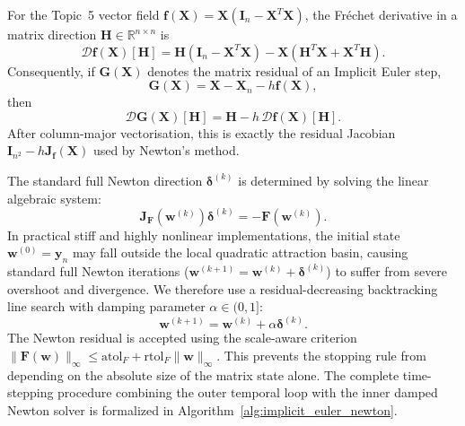 \documentclass[11pt,a4paper]{article}
\theoremstyle{definition}
\theoremstyle{remark}
\begin{document}
For the Topic~5 vector field
$\mathbf{f}(\mathbf{X})=\mathbf{X}(\mathbf{I}_n-\mathbf{X}^T\mathbf{X})$,
the Fr\'echet derivative in a matrix direction
$\mathbf{H}\in\mathbb{R}^{n\times n}$ is
\begin{equation}
\label{eq:topic5_frechet_derivative}
\mathcal{D}\mathbf{f}(\mathbf{X})[\mathbf{H}]
=\mathbf{H}(\mathbf{I}_n-\mathbf{X}^T\mathbf{X})
-\mathbf{X}(\mathbf{H}^T\mathbf{X}+\mathbf{X}^T\mathbf{H}).
\end{equation}
Consequently, if $\mathbf{G}(\mathbf{X})$ denotes the matrix residual of
an Implicit Euler step,
\begin{equation}
\label{eq:topic5_matrix_residual}
\mathbf{G}(\mathbf{X})=\mathbf{X}-\mathbf{X}_n-h\mathbf{f}(\mathbf{X}),
\end{equation}
then
\begin{equation}
\label{eq:topic5_residual_frechet}
\mathcal{D}\mathbf{G}(\mathbf{X})[\mathbf{H}]
=\mathbf{H}-h\,\mathcal{D}\mathbf{f}(\mathbf{X})[\mathbf{H}].
\end{equation}
After column-major vectorisation, this is exactly the residual Jacobian
$\mathbf{I}_{n^2}-h\mathbf{J}_{\mathbf f}(\mathbf X)$ used by Newton's method.

The standard full Newton direction $\boldsymbol{\delta}^{(k)}$ is determined by solving the linear algebraic system:
\begin{equation}
\label{eq:newton_linear_system}
\mathbf{J}_{\mathbf{F}}\left(\mathbf{w}^{(k)}\right) \boldsymbol{\delta}^{(k)} = -\mathbf{F}\left(\mathbf{w}^{(k)}\right).
\end{equation}
In practical stiff and highly nonlinear implementations, the initial state $\mathbf{w}^{(0)} = \mathbf{y}_n$ may fall outside the local quadratic attraction basin, causing standard full Newton iterations ($\mathbf{w}^{(k+1)} = \mathbf{w}^{(k)} + \boldsymbol{\delta}^{(k)}$) to suffer from severe overshoot and divergence. We therefore use a residual-decreasing backtracking line search with damping parameter $\alpha \in (0,1]$:
\begin{equation}
\label{eq:newton_damped_update}
\mathbf{w}^{(k+1)} = \mathbf{w}^{(k)} + \alpha \boldsymbol{\delta}^{(k)}.
\end{equation}
The Newton residual is accepted using the scale-aware criterion
$\|\mathbf{F}(\mathbf{w})\|_\infty\le
\mathrm{atol}_F+\mathrm{rtol}_F\|\mathbf{w}\|_\infty$.
This prevents the stopping rule from depending on the absolute size of
the matrix state alone.
The complete time-stepping procedure combining the outer temporal loop with the inner damped Newton solver is formalized in Algorithm~\ref{alg:implicit_euler_newton}.
\end{document}
